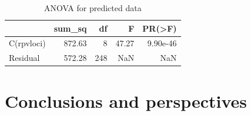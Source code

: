 \documentclass[english]{article}
\begin{document}
\begin{table}[H]
\centering
\caption{ANOVA for predicted data}
\label{tab:poivannova}
\begin{tabular}{lrrrr}
\toprule
{} &      sum\_sq &     df &          F &        PR(>F) \\
\midrule
C(rpvloci) &  872.63 &    8 &  47.27 &  9.90e-46 \\
Residual   &  572.28 &  248 &        NaN &           NaN \\
\bottomrule
\end{tabular}
\end{table}

\section{Conclusions and perspectives}
\end{document}
